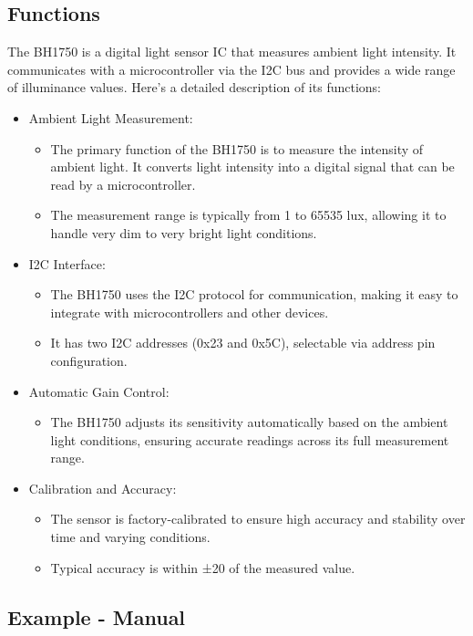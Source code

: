 \subsection{Functions}
The BH1750 is a digital light sensor IC that measures ambient light intensity. It communicates with a microcontroller via the I2C bus and provides a wide range \cite{Podbucki:2023} of illuminance values. Here's a detailed description of its functions:

\begin{itemize}
	\item Ambient Light Measurement:
	\begin{itemize}
		\item The primary function of the BH1750 is to measure the intensity of ambient light. It converts light intensity into a digital signal that can be read by a microcontroller.
		\item The measurement range is typically from 1 to 65535 lux, allowing it to handle very dim to very bright light conditions.
	\end{itemize}
	\item I2C Interface:
	\begin{itemize}
		\item The BH1750 uses the I2C protocol for communication, making it easy to integrate with microcontrollers and other devices.
		\item It has two I2C addresses (0x23 and 0x5C), selectable via address pin configuration.
	\end{itemize}
	
		\item Automatic Gain Control:
	\begin{itemize}
		\item The BH1750 adjusts its sensitivity automatically based on the ambient light conditions, ensuring accurate readings across its full measurement range.
	\end{itemize}
	
		\item Calibration and Accuracy:
	\begin{itemize}
		\item The sensor is factory-calibrated to ensure high accuracy and stability over time and varying conditions.
		\item Typical accuracy is within ±20 of the measured value.
	\end{itemize}
\end{itemize}


\subsection{Example - Manual}

